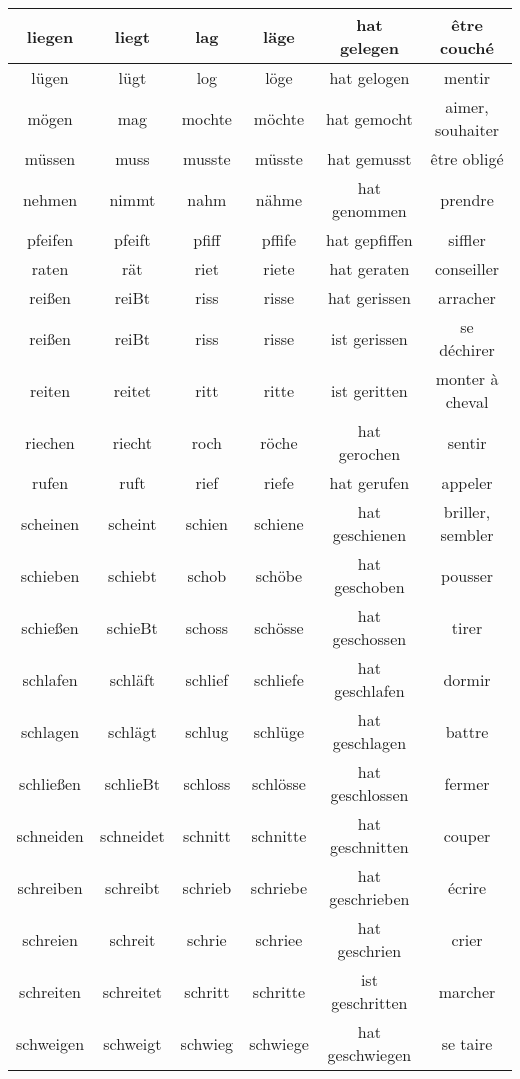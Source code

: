 \documentclass{article}
\begin{document}
\begin{center}
\begin{longtable}{|c|c|c|c|c|c|}
	\hline
	liegen &  liegt &  lag &  läge &  hat gelegen & être couché
\\
	\hline
	lügen &  lügt &  log &  löge &  hat gelogen & mentir
\\
	\hline
	mögen &  mag &  mochte &  möchte &  hat gemocht & aimer, souhaiter
\\
	\hline
	müssen &  muss &  musste &  müsste &  hat gemusst & être obligé
\\
	\hline
	nehmen &  nimmt &  nahm &  nähme &  hat genommen & prendre
\\
	\hline
	pfeifen &  pfeift &  pfiff &  pffife &  hat gepfiffen & siffler
\\
	\hline
	raten &  rät &  riet &  riete &  hat geraten & conseiller
\\
	\hline
	reißen &  reiBt &  riss &  risse &  hat gerissen & arracher
\\
	\hline
	reißen &  reiBt &  riss &  risse &  ist gerissen & se déchirer
\\
	\hline
	reiten &  reitet &  ritt &  ritte &  ist geritten & monter à cheval
\\
	\hline
	riechen &  riecht &  roch &  röche &  hat gerochen & sentir
\\
	\hline
	rufen &  ruft &  rief &  riefe &  hat gerufen & appeler
\\
	\hline
	scheinen &  scheint &  schien &  schiene &  hat geschienen & briller, sembler
\\
	\hline
	schieben &  schiebt &  schob &  schöbe &  hat geschoben & pousser
\\
	\hline
	schießen &  schieBt &  schoss &  schösse &  hat geschossen & tirer
\\
	\hline
	schlafen &  schläft &  schlief &  schliefe &  hat geschlafen & dormir
\\
	\hline
	schlagen &  schlägt &  schlug &  schlüge &  hat geschlagen & battre
\\
	\hline
	schließen &  schlieBt &  schloss &  schlösse &  hat geschlossen & fermer
\\
	\hline
	schneiden &  schneidet &  schnitt &  schnitte &  hat geschnitten & couper
\\
	\hline
	schreiben &  schreibt &  schrieb &  schriebe &  hat geschrieben & écrire
\\
	\hline
	schreien &  schreit &  schrie &  schriee &  hat geschrien & crier
\\
	\hline
	schreiten &  schreitet &  schritt &  schritte &  ist geschritten & marcher
\\
	\hline
	schweigen &  schweigt &  schwieg &  schwiege &  hat geschwiegen & se taire

\end{longtable}
\end{center}
\end{document}
